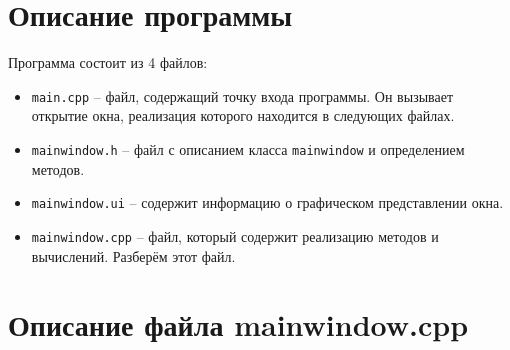 \section{Описание программы}

Программа состоит из 4 файлов:

\begin{itemize}
\item \texttt{main.cpp} -- файл, содержащий точку входа программы. Он вызывает открытие окна, реализация которого находится в следующих файлах.
\item \texttt{mainwindow.h} -- файл с описанием класса \texttt{mainwindow} и определением методов.
\item \texttt{mainwindow.ui} -- содержит информацию о графическом представлении окна.
\item \texttt{mainwindow.cpp} -- файл, который содержит реализацию методов и вычислений. Разберём этот файл.
\end{itemize}

\section*{Описание файла mainwindow.cpp}

